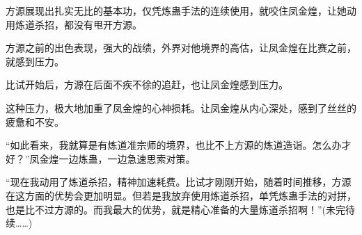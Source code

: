 \begin{this_body}
方源展现出扎实无比的基本功，仅凭炼蛊手法的连续使用，就咬住凤金煌，让她动用炼道杀招，都没有甩开方源。

方源之前的出色表现，强大的战绩，外界对他境界的高估，让凤金煌在比赛之前，就感到压力。

比试开始后，方源在后面不疾不徐的追赶，也让凤金煌感到压力。

这种压力，极大地加重了凤金煌的心神损耗。让凤金煌从内心深处，感到了丝丝的疲惫和不安。

“如此看来，我就算是有炼道准宗师的境界，也比不上方源的炼道造诣。怎么办才好？”凤金煌一边炼蛊，一边急速思索对策。

“现在我动用了炼道杀招，精神加速耗费。比试才刚刚开始，随着时间推移，方源在这方面的优势会更加明显。但若是我放弃使用炼道杀招，单凭炼蛊手法的对拼，也是比不过方源的。而我最大的优势，就是精心准备的大量炼道杀招啊！”(未完待续……)

\end{this_body}


